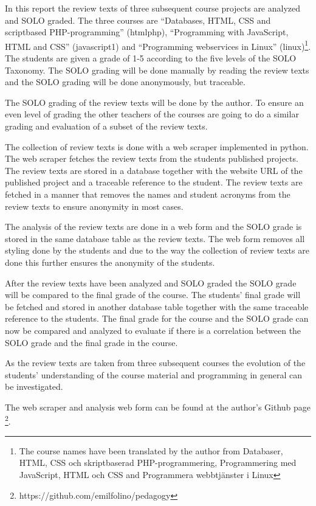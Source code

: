 \documentclass[twoside,twocolumn,a4paper,11pt,english]{article}
\begin{document}
In this report the review texts of three subsequent course projects are analyzed and SOLO graded. The three courses are ``Databases, HTML, CSS and scriptbased PHP-programming'' (htmlphp), ``Programming with JavaScript, HTML and CSS'' (javascript1) and ``Programming webservices in Linux'' (linux)\footnote{The course names have been translated by the author from Databaser, HTML, CSS och skriptbaserad PHP-programmering, Programmering med JavaScript, HTML och CSS and Programmera webbtjänster i Linux}. The students are given a grade of 1-5 according to the five levels of the SOLO Taxonomy. The SOLO grading will be done manually by reading the review texts and the SOLO grading will be done anonymously, but traceable.

The SOLO grading of the review texts will be done by the author. To ensure an even level of grading the other teachers of the courses are going to do a similar grading and evaluation of a subset of the review texts.

The collection of review texts is done with a web scraper implemented in python. The web scraper fetches the review texts from the students published projects. The review texts are stored in a database together with the website URL of the published project and a traceable reference to the student. The review texts are fetched in a manner that removes the names and student acronyms from the review texts to ensure anonymity in most cases.

The analysis of the review texts are done in a web form and the SOLO grade is stored in the same database table as the review texts. The web form removes all styling done by the students and due to the way the collection of review texts are done this further ensures the anonymity of the students.

After the review texts have been analyzed and SOLO graded the SOLO grade will be compared to the final grade of the course. The students' final grade will be fetched and stored in another database table together with the same traceable reference to the students. The final grade for the course and the SOLO grade can now be compared and analyzed to evaluate if there is a correlation between the SOLO grade and the final grade in the course.

As the review texts are taken from three subsequent courses the evolution of the students' understanding of the course material and programming in general can be investigated.

The web scraper and analysis web form can be found at the author's Github page \footnote{https://github.com/emilfolino/pedagogy}.
\end{document}
